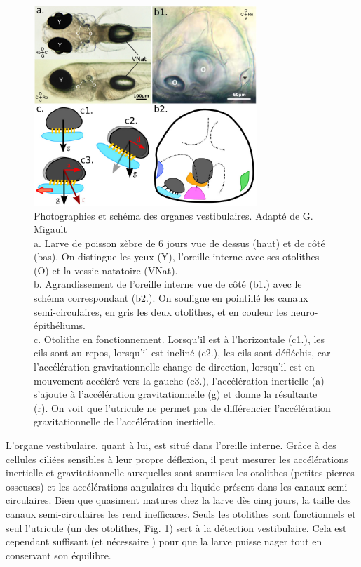 \begin{figure}
  \centering
  \includegraphics[width=0.75\textwidth]{./files/appareil_vestibulaire.svg.jpg}
  \caption{Photographies et schéma des organes vestibulaires. Adapté de G. Migault
  \\ a. Larve de poisson zèbre de 6 jours vue de dessus (haut) et de côté (bas). On distingue les yeux (Y), l'oreille interne avec ses otolithes (O) et la vessie natatoire (VNat).
  \\ b. Agrandissement de l'oreille interne vue de côté (b1.) avec le schéma correspondant (b2.). On souligne en pointillé les canaux semi-circulaires, en gris les deux otolithes, et en couleur les neuro-épithéliums.
  \\ c. Otolithe en fonctionnement. Lorsqu'il est à l'horizontale (c1.), les cils sont au repos, lorsqu'il est incliné (c2.), les cils sont défléchis, car l'accélération gravitationnelle change de direction, lorsqu'il est en mouvement accéléré vers la gauche (c3.), l'accélération inertielle (a) s'ajoute à l'accélération gravitationnelle (g) et donne la résultante (r). On voit que l'utricule ne permet pas de différencier l'accélération gravitationnelle de l'accélération inertielle.
  \label{FIGorganevestib}}
  \end{figure}

L'organe vestibulaire, quant à lui, est situé dans l'oreille interne. Grâce à des cellules ciliées sensibles à leur propre déflexion, il peut mesurer les accélérations inertielle et gravitationnelle auxquelles sont soumises les otolithes (petites pierres osseuses) et les accélérations angulaires du liquide présent dans les canaux semi-circulaires. Bien que quasiment matures chez la larve dès cinq jours, la taille des canaux semi-circulaires les rend inefficaces. Seuls les otolithes sont fonctionnels et seul l'utricule (un des otolithes, Fig. \ref{FIGorganevestib}) sert à la détection vestibulaire. Cela est cependant suffisant (et nécessaire \cite{riley_development_2000}) pour que la larve puisse nager tout en conservant son équilibre.

